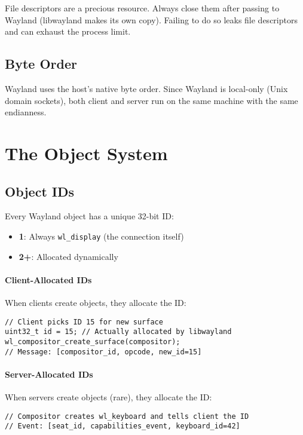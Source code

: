 \begin{importantbox}
File descriptors are a precious resource. Always close them after passing to Wayland (libwayland makes its own copy). Failing to do so leaks file descriptors and can exhaust the process limit.
\end{importantbox}

\subsection{Byte Order}

Wayland uses the host's native byte order. Since Wayland is local-only (Unix domain sockets), both client and server run on the same machine with the same endianness.

\section{The Object System}

\subsection{Object IDs}

Every Wayland object has a unique 32-bit ID:
\begin{itemize}
    \item \textbf{1}: Always \texttt{wl\_display} (the connection itself)
    \item \textbf{2+}: Allocated dynamically
\end{itemize}

\paragraph{Client-Allocated IDs}
When clients create objects, they allocate the ID:
\begin{lstlisting}[style=cstyle, caption=Client Allocates ID]
// Client picks ID 15 for new surface
uint32_t id = 15; // Actually allocated by libwayland
wl_compositor_create_surface(compositor);
// Message: [compositor_id, opcode, new_id=15]
\end{lstlisting}

\paragraph{Server-Allocated IDs}
When servers create objects (rare), they allocate the ID:
\begin{lstlisting}[style=cstyle, caption=Server Allocates ID]
// Compositor creates wl_keyboard and tells client the ID
// Event: [seat_id, capabilities_event, keyboard_id=42]
\end{lstlisting}

